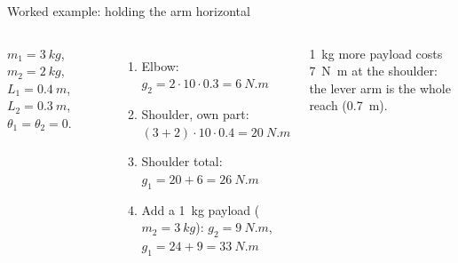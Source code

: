 \documentclass[aspectratio=169,10pt]{beamer}
\newcommand{\arm}[3]{%
  \draw[#3] (0,0) -- ++(#1:2.4) coordinate (E) -- ++(#1+#2:1.8) coordinate (T);
  \node[jnt] at (0,0) {}; \node[jnt] at (E) {}; \fill[mkOrange] (T) circle (1.6pt);}
\newcommand{\base}{\fill[pattern=north east lines,pattern color=mkGray] (-.35,-.25) rectangle (.35,-.08);
  \draw[mkGray,line width=.8pt] (-.35,-.08) -- (.35,-.08);}
\begin{document}
\begin{frame}[t]{Worked example: holding the arm horizontal}
\begin{columns}[T,onlytextwidth]
\small
$m_1=\SI{3}{kg}$, $m_2=\SI{2}{kg}$, $L_1=\SI{0.4}{m}$, $L_2=\SI{0.3}{m}$, $\theta_1=\theta_2=0$.
\begin{enumerate}
\item Elbow: $g_2=2\cdot10\cdot0.3=\SI{6}{N.m}$
\item Shoulder, own part: $(3+2)\cdot10\cdot0.4=\SI{20}{N.m}$
\item Shoulder total: $g_1=20+6=\SI{26}{N.m}$
\item Add a \SI{1}{kg} payload ($m_2=\SI{3}{kg}$): $g_2=\SI{9}{N.m}$, $g_1=24+9=\SI{33}{N.m}$
\end{enumerate}
\begin{keybox}
\SI{1}{kg} more payload costs \SI{7}{N.m} at the shoulder: the lever arm is the whole reach (\SI{0.7}{m}).
\end{keybox}
\centering
{}
\end{columns}
\end{frame}
\end{document}
